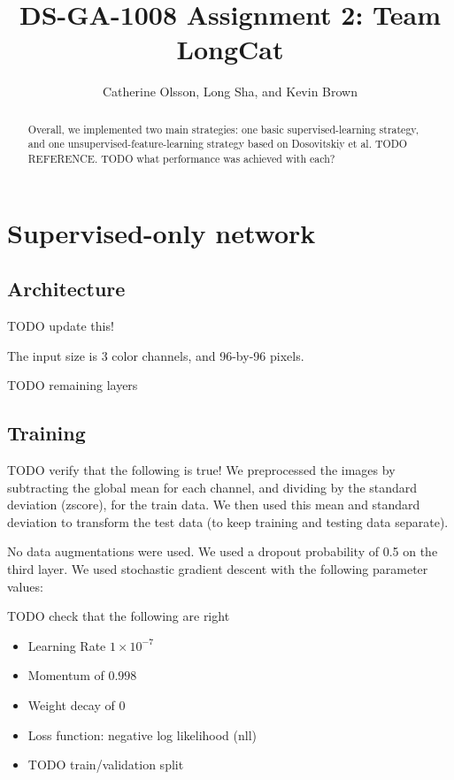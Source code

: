 \documentclass{article} %
\title{DS-GA-1008 Assignment 2: Team LongCat}
\author{
Catherine Olsson, Long Sha, and Kevin Brown \\
}
\newenvironment{itemizedense}{
\begin{itemize}
  \setlength{\itemsep}{1pt}
  \setlength{\parskip}{0pt}
  \setlength{\parsep}{0pt}
}{\end{itemize}}
\begin{document}
\maketitle

\begin{abstract}
Overall, we implemented two main strategies: one basic supervised-learning strategy, and one unsupervised-feature-learning strategy based on Dosovitskiy et al. TODO REFERENCE. TODO what performance was achieved with each?
\end{abstract}

\section{Supervised-only network}

\subsection{Architecture}
TODO update this!

The input size is 3 color channels, and 96-by-96 pixels. 

TODO remaining layers

\subsection{Training}

TODO verify that the following is true!
We preprocessed the images by subtracting the global mean for each channel, and dividing by the standard deviation (zscore), for the train data. We then used this mean and standard deviation to transform the test data (to keep training and testing data separate).

No data augmentations were used. We used a dropout probability of 0.5 on the third layer. We used stochastic gradient descent with the following parameter values:

TODO check that the following are right

\begin{itemizedense}
\item Learning Rate $1 \times 10^{-7}$
\item Momentum of $0.998$
\item Weight decay of $0$
\item Loss function: negative log likelihood (nll)
\item TODO train/validation split
\end{itemizedense}
\end{document}
